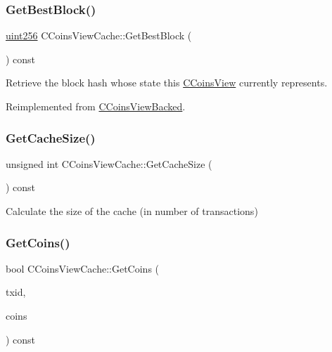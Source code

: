 \subsubsection{\texorpdfstring{Get\+Best\+Block()}{GetBestBlock()}}
{\footnotesize\ttfamily \mbox{\hyperlink{classuint256}{uint256}} C\+Coins\+View\+Cache\+::\+Get\+Best\+Block (\begin{DoxyParamCaption}{ }\end{DoxyParamCaption}) const\hspace{0.3cm}{\ttfamily [virtual]}}



Retrieve the block hash whose state this \mbox{\hyperlink{class_c_coins_view}{C\+Coins\+View}} currently represents. 



Reimplemented from \mbox{\hyperlink{class_c_coins_view_backed_a39bca41ae922d0ce7f40e8aeab289280}{C\+Coins\+View\+Backed}}.

\mbox{\label{class_c_coins_view_cache_a937e30d96fd43e403c862b193cf5b942}} 
\subsubsection{\texorpdfstring{Get\+Cache\+Size()}{GetCacheSize()}}
{\footnotesize\ttfamily unsigned int C\+Coins\+View\+Cache\+::\+Get\+Cache\+Size (\begin{DoxyParamCaption}{ }\end{DoxyParamCaption}) const}



Calculate the size of the cache (in number of transactions) 

\mbox{\label{class_c_coins_view_cache_a1b62444593fdb580bfa4bd6fab41fafa}} 
\subsubsection{\texorpdfstring{Get\+Coins()}{GetCoins()}}
{\footnotesize\ttfamily bool C\+Coins\+View\+Cache\+::\+Get\+Coins (\begin{DoxyParamCaption}\item[{const \mbox{\hyperlink{classuint256}{uint256}} \&}]{txid,  }\item[{\mbox{\hyperlink{class_c_coins}{C\+Coins}} \&}]{coins }\end{DoxyParamCaption}) const\hspace{0.3cm}{\ttfamily [virtual]}}




